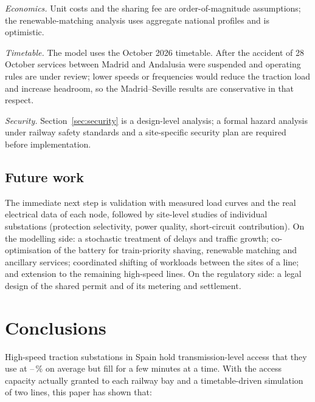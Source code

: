 \emph{Economics.} Unit costs and the sharing fee are order-of-magnitude assumptions; the renewable-matching analysis uses aggregate national profiles and is optimistic.

\emph{Timetable.} The model uses the October 2026 timetable. After the accident of 28 October services between Madrid and Andalusia were suspended and operating rules are under review; lower speeds or frequencies would reduce the traction load and increase headroom, so the Madrid--Seville results are conservative in that respect.

\emph{Security.} Section~\ref{sec:security} is a design-level analysis; a formal hazard analysis under railway safety standards and a site-specific security plan are required before implementation.

\subsection{Future work}

The immediate next step is validation with measured load curves and the real electrical data of each node, followed by site-level studies of individual substations (protection selectivity, power quality, short-circuit contribution). On the modelling side: a stochastic treatment of delays and traffic growth; co-optimisation of the battery for train-priority shaving, renewable matching and ancillary services; coordinated shifting of workloads between the sites of a line; and extension to the remaining high-speed lines. On the regulatory side: a legal design of the shared permit and of its metering and settlement.

\section{Conclusions}
\label{sec:conclusions}

High-speed traction substations in Spain hold transmission-level access that they use at \msUsePct--\mzbUsePct\,\% on average but fill for a few minutes at a time. With the access capacity actually granted to each railway bay and a timetable-driven simulation of two lines, this paper has shown that:

